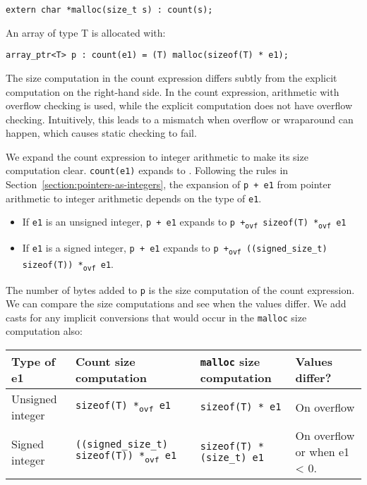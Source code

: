 \begin{verbatim}
extern char *malloc(size_t s) : count(s);
\end{verbatim}

An array of type T is allocated with:

\begin{verbatim}
array_ptr<T> p : count(e1) = (T) malloc(sizeof(T) * e1);
\end{verbatim}

The size computation in the count expression differs subtly from the
explicit computation on the right-hand side. In the count expression,
arithmetic with overflow checking is used, while the explicit
computation does not have overflow checking. Intuitively, this leads to
a mismatch when overflow or wraparound can happen, which causes static
checking to fail.

We expand the count expression to integer arithmetic to make its size
computation clear. \texttt{count(e1)} expands to . 
Following the rules in Section~\ref{section:pointers-as-integers},
the expansion of \texttt{p +
e1} from pointer arithmetic to integer arithmetic depends on the type of
\texttt{e1}.

\begin{itemize}
\item
  If \texttt{e1} is an unsigned integer, \texttt{p + e1} expands to
  \texttt{p +\textsubscript{ovf} sizeof(T) *\textsubscript{ovf} e1}
\item
  If \texttt{e1} is a signed integer, \texttt{p + e1} expands to
  \texttt{p +\textsubscript{ovf} ((signed\_size\_t) sizeof(T))
  *\textsubscript{ovf} e1}.
\end{itemize}

The number of bytes added to \texttt{p} is the size computation of the
count expression. We can compare the size computations and see when the
values differ. We add casts for any implicit conversions that would
occur in the \texttt{malloc} size computation also:

\begin{longtable}[c]{@{}llll@{}}
\toprule
Type of e1 & Count size computation & \texttt{malloc} size computation &
Values differ?\tabularnewline
\midrule
\endhead
Unsigned integer & \texttt{sizeof(T) *\textsubscript{ovf} e1} &
\texttt{sizeof(T) * e1} & On overflow\tabularnewline
Signed integer & \texttt{((signed\_size\_t) sizeof(T))
*\textsubscript{ovf} e1} & \texttt{sizeof(T) * (size\_t) e1} & On
overflow or when e1 \textless{} 0.\tabularnewline
\bottomrule
\end{longtable}


